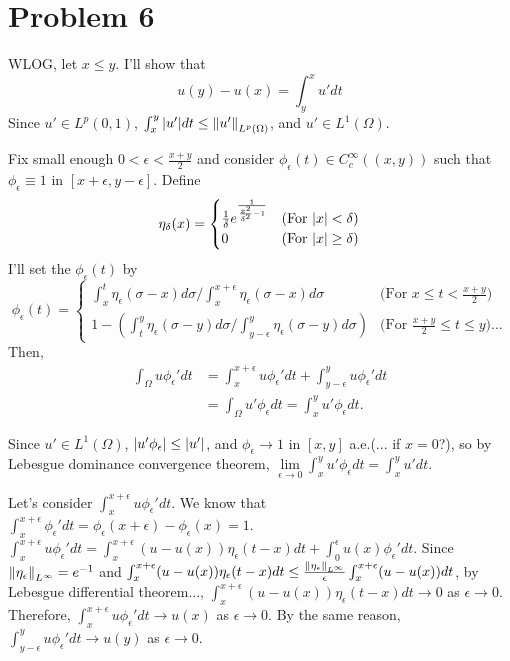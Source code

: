 \documentclass{article}
\begin{document}
\section*{Problem 6}
WLOG, let $x\leq y$. I'll show that
\begin{equation*}
u(y)-u(x)=\int_y^x u' dt
\end{equation*}
Since $u'\in L^p(0, 1)$, $\int_x^y \abs{u'} dt\leq \norm{u'}_{L^p(\Omega)}$, and $u'\in L^1(\Omega)$.

Fix small enough $0<\epsilon<\frac{x+y}{2}$ and consider $\phi_\epsilon(t)\in C_c^\infty((x, y))$ such that $\phi_\epsilon\equiv 1$ in $[x+\epsilon, y-\epsilon]$. Define 
\begin{equation*}
\eta_\delta(x)=
\begin{cases}
\frac{1}{\delta}e^{\frac{1}{\frac{x^2}{\delta^2}-1}} & \text{(For }\abs{x}<\delta\text{)} \\
0 & \text{(For }\abs{x}\geq\delta\text{)}
\end{cases}
\end{equation*}
I'll set the $\phi_\epsilon(t)$ by
\begin{equation*}
\phi_\epsilon(t)=
\begin{cases}
\int_x^t \eta_\epsilon(\sigma-x)d\sigma/\int_x^{x+\epsilon} \eta_\epsilon(\sigma-x)d\sigma & \text{(For }x\leq t<\frac{x+y}{2}\text{)} \\
1-\left(\int_t^y \eta_\epsilon(\sigma-y)d\sigma/\int_{y-\epsilon}^y \eta_\epsilon(\sigma-y)d\sigma\right) & \text{(For }\frac{x+y}{2}\leq t\leq y\text{)}...
\end{cases}
\end{equation*}
Then,
\begin{equation*}
\begin{split}
\int_\Omega u\phi_\epsilon'dt&=\int_{x}^{x+\epsilon} u \phi_\epsilon' dt + \int_{y-\epsilon}^{y} u \phi_\epsilon' dt \\
&=\int_\Omega u'\phi_\epsilon dt=\int_{x}^{y} u'\phi_\epsilon dt.
\end{split}
\end{equation*}

Since $u'\in L^1(\Omega)$, $\abs{u'\phi_\epsilon}\leq \abs{u'}$, and $\phi_\epsilon\rightarrow 1$ in $[x,y]$ a.e.(... if $x=0$?), so by Lebesgue dominance convergence theorem, $\lim\limits_{\epsilon\rightarrow 0} \int_x^y u'\phi_\epsilon dt=\int_x^y u' dt$.

Let's consider $\int_x^{x+\epsilon} u\phi_\epsilon' dt$. We know that $\int_x^{x+\epsilon} \phi_\epsilon' dt=\phi_\epsilon(x+\epsilon)-\phi_\epsilon(x)=1$. $\int_x^{x+\epsilon} u\phi_\epsilon' dt=\int_x^{x+\epsilon} (u - u(x)) \eta_\epsilon(t-x) dt + \int_0^\epsilon u(x)\phi_\epsilon' dt$. Since $\norm{\eta_\epsilon}_{L^\infty}=e^{-1}$ and $\int_x^{x+\epsilon} (u - u(x)) \eta_\epsilon(t-x) dt \leq \frac{\norm{\eta_\epsilon}_{L^\infty}}{\epsilon}\int_x^{x+\epsilon} (u - u(x)) dt$, by Lebesgue differential theorem..., $\int_x^{x+\epsilon} (u - u(x)) \eta_\epsilon(t-x) dt\rightarrow 0$ as $\epsilon\rightarrow 0$. 
Therefore, $\int_x^{x+\epsilon} u\phi_\epsilon' dt \rightarrow u(x)$ as $\epsilon\rightarrow 0$. 
By the same reason, $\int_{y-\epsilon}^y u\phi_\epsilon' dt \rightarrow u(y)$ as $\epsilon\rightarrow 0$.
\end{document}
